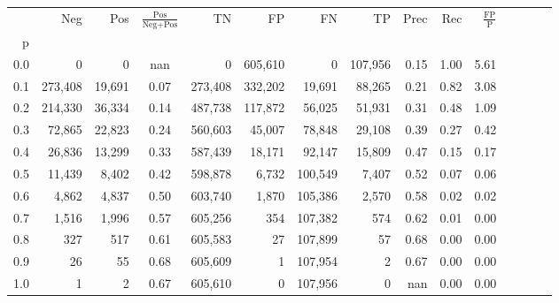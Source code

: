 \begin{tabular}{rrrcrrrrrrrrrrr}
\toprule
{} &      Neg &     Pos & $\frac{\text{Pos}}{\text{Neg}+\text{Pos}}$ &       TN &       FP &       FN &       TP &  Prec &   Rec & $\frac{\text{FP}}{\text{P}}$ \\
p   &          &         &                                            &          &          &          &          &       &       &                              \\
\midrule
0.0 &        0 &       0 &                                        nan &        0 &  605,610 &        0 &  107,956 &  0.15 &  1.00 &                         5.61 \\
0.1 &  273,408 &  19,691 &                                       0.07 &  273,408 &  332,202 &   19,691 &   88,265 &  0.21 &  0.82 &                         3.08 \\
0.2 &  214,330 &  36,334 &                                       0.14 &  487,738 &  117,872 &   56,025 &   51,931 &  0.31 &  0.48 &                         1.09 \\
0.3 &   72,865 &  22,823 &                                       0.24 &  560,603 &   45,007 &   78,848 &   29,108 &  0.39 &  0.27 &                         0.42 \\
0.4 &   26,836 &  13,299 &                                       0.33 &  587,439 &   18,171 &   92,147 &   15,809 &  0.47 &  0.15 &                         0.17 \\
0.5 &   11,439 &   8,402 &                                       0.42 &  598,878 &    6,732 &  100,549 &    7,407 &  0.52 &  0.07 &                         0.06 \\
0.6 &    4,862 &   4,837 &                                       0.50 &  603,740 &    1,870 &  105,386 &    2,570 &  0.58 &  0.02 &                         0.02 \\
0.7 &    1,516 &   1,996 &                                       0.57 &  605,256 &      354 &  107,382 &      574 &  0.62 &  0.01 &                         0.00 \\
0.8 &      327 &     517 &                                       0.61 &  605,583 &       27 &  107,899 &       57 &  0.68 &  0.00 &                         0.00 \\
0.9 &       26 &      55 &                                       0.68 &  605,609 &        1 &  107,954 &        2 &  0.67 &  0.00 &                         0.00 \\
1.0 &        1 &       2 &                                       0.67 &  605,610 &        0 &  107,956 &        0 &   nan &  0.00 &                         0.00 \\
\bottomrule
\end{tabular}
